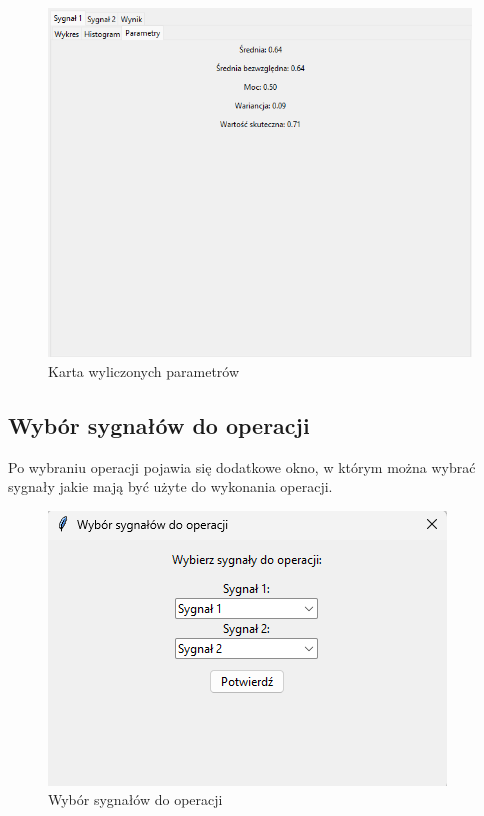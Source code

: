 \documentclass{article}
\begin{document}
\begin{figure}[h!]
    \centering
    \includegraphics[width=\textwidth]{img/param.png}
    \caption{Karta wyliczonych parametrów}
\end{figure}
\FloatBarrier
\subsection{Wybór sygnałów do operacji} 


Po wybraniu operacji pojawia się dodatkowe okno, w którym można 
wybrać sygnały jakie mają być użyte do wykonania operacji.
\FloatBarrier
\begin{figure}[h!]
    \centering
    \includegraphics[width=\textwidth]{img/wybor.png}
    \caption{Wybór sygnałów do operacji}
\end{figure}
\end{document}
